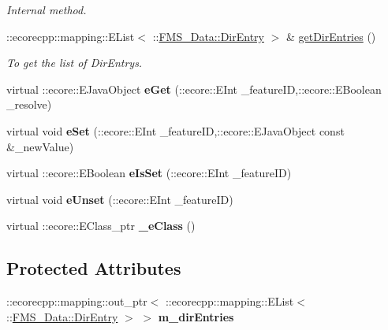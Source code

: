 \begin{DoxyCompactItemize}
\begin{DoxyCompactList}\small\item\em Internal method. \item\end{DoxyCompactList}\item 
::ecorecpp::mapping::EList$<$ ::\hyperlink{classFMS__Data_1_1DirEntry}{FMS\_\-Data::DirEntry} $>$ \& \hyperlink{classFMS__Data_1_1DirEntryList_a9abb5778ef8ca95e687144bce2eb9e69}{getDirEntries} ()
\begin{DoxyCompactList}\small\item\em To get the list of DirEntrys. \item\end{DoxyCompactList}\item 
\hypertarget{classFMS__Data_1_1DirEntryList_a105364841288acbb196f9f39d20edb8c}{
virtual ::ecore::EJavaObject {\bfseries eGet} (::ecore::EInt \_\-featureID,::ecore::EBoolean \_\-resolve)}
\label{classFMS__Data_1_1DirEntryList_a105364841288acbb196f9f39d20edb8c}

\item 
\hypertarget{classFMS__Data_1_1DirEntryList_aaadc8cd62f745200cfccc06ee2618bd7}{
virtual void {\bfseries eSet} (::ecore::EInt \_\-featureID,::ecore::EJavaObject const \&\_\-newValue)}
\label{classFMS__Data_1_1DirEntryList_aaadc8cd62f745200cfccc06ee2618bd7}

\item 
\hypertarget{classFMS__Data_1_1DirEntryList_a4e371085ea61a23fb875e337fb8866a6}{
virtual ::ecore::EBoolean {\bfseries eIsSet} (::ecore::EInt \_\-featureID)}
\label{classFMS__Data_1_1DirEntryList_a4e371085ea61a23fb875e337fb8866a6}

\item 
\hypertarget{classFMS__Data_1_1DirEntryList_a6c2d0a8899c6b65f45b166531666c3a4}{
virtual void {\bfseries eUnset} (::ecore::EInt \_\-featureID)}
\label{classFMS__Data_1_1DirEntryList_a6c2d0a8899c6b65f45b166531666c3a4}

\item 
\hypertarget{classFMS__Data_1_1DirEntryList_adb4d237a8a4f5257f1ea7d8ba394e06d}{
virtual ::ecore::EClass\_\-ptr {\bfseries \_\-eClass} ()}
\label{classFMS__Data_1_1DirEntryList_adb4d237a8a4f5257f1ea7d8ba394e06d}

\end{DoxyCompactItemize}
\subsection*{Protected Attributes}
\begin{DoxyCompactItemize}
\item 
\hypertarget{classFMS__Data_1_1DirEntryList_a7bc55f3262d0d7530effdff2835c3b6f}{
::ecorecpp::mapping::out\_\-ptr$<$ ::ecorecpp::mapping::EList$<$ ::\hyperlink{classFMS__Data_1_1DirEntry}{FMS\_\-Data::DirEntry} $>$ $>$ {\bfseries m\_\-dirEntries}}
\label{classFMS__Data_1_1DirEntryList_a7bc55f3262d0d7530effdff2835c3b6f}

\end{DoxyCompactItemize}


